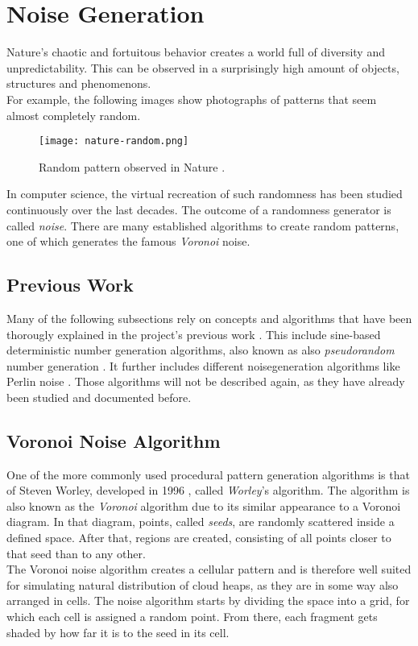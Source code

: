 \section{Noise Generation}
\label{section:noise}
Nature's chaotic and fortuitous behavior creates a world full of diversity and unpredictability.
This can be observed in a surprisingly high amount of objects, structures and phenomenons.
\\
For example, the following images show photographs of patterns that seem almost completely random.

\begin{figure}[H]
    \texttt{[image: nature-random.png]}
    \caption{Random pattern observed in Nature \protect\cite{bookofshaders:noise}.}
    \label{img:rnd:natural}
\end{figure}

\noindent
In computer science, the virtual recreation of such randomness has been studied continuously over the last decades.
The outcome of a randomness generator is called \emph{\gls{noise}}.
There are many established algorithms to create random patterns, one of which generates the famous \emph{Voronoi} \gls{noise}.

\subsection{Previous Work}
Many of the following subsections rely on concepts and algorithms that have been thorougly explained in the project's previous work \cite{project2:noise}.
This include sine-based deterministic number generation algorithms, also known as also \emph{\gls{pseudorandom}} number generation \cite{project2:noise:pseudo}.
It further includes different \gls{noisegeneration} algorithms like Perlin \gls{noise} \cite{project2:noise:perlin}.
\emptyline
Those algorithms will not be described again, as they have already been studied and documented before.

\pagebreak

\subsection{Voronoi Noise Algorithm}
\label{section:noise:voronoi}
One of the more commonly used procedural pattern generation algorithms is that of Steven Worley, developed in 1996 \cite{worley}, called \emph{Worley}'s algorithm.
The algorithm is also known as the \emph{Voronoi} algorithm due to its similar appearance to a Voronoi diagram.
In that diagram, points, called \emph{seeds}, are randomly scattered inside a defined space.
After that, regions are created, consisting of all points closer to that seed than to any other.
\\
The Voronoi \gls{noise} algorithm creates a cellular pattern and is therefore well suited for simulating natural distribution of cloud heaps, as they are in some way also arranged in cells.
\emptyline
The \gls{noise} algorithm starts by dividing the space into a grid, for which each cell is assigned a random point.
From there, each fragment gets shaded by how far it is to the seed in its cell.


